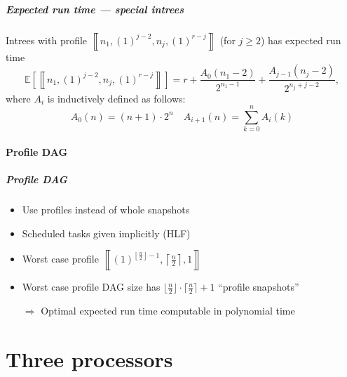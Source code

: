 \documentclass{beamer}
\newcommand{\profile}[1]{\left\llbracket #1 \right\rrbracket}
\newcommand{\profilerepeat}[2]{{(#1)}^{#2}}
\newcommand{\profileones}[1]{\profilerepeat{1}{#1}}
\newcommand{\E}[1]{\mathbb{E}\left[ #1 \right]}
\begin{document}
\begin{frame}
  \frametitle{Expected run time --- special intrees}
  \begin{theorem}
    Intrees with profile $\profile{n_1,\profileones{j-2},n_j,\profileones{r-j}}$ (for $j\geq 2$) has expected run time
    \begin{equation*}
      \E{\profile{n_1,\profileones{j-2},n_j,\profileones{r-j}}} = 
      r + \frac{A_0(n_1-2)}{2^{n_1-1}} + \frac{A_{j-1}(n_j-2)}{2^{n_j+j-2}},
    \end{equation*}
    where $A_i$ is inductively defined as follows:
    \begin{equation*}
      A_0(n) = (n+1) \cdot 2^n \quad 
      A_{i+1}(n) = \sum_{k=0}^n A_{i}(k)
    \end{equation*}
  \end{theorem}
\end{frame}

\subsection{Profile DAG}

\begin{frame}
  \frametitle{Profile DAG}
  \begin{itemize}
  \item Use profiles instead of whole snapshots
  \item Scheduled tasks given implicitly (HLF)
  \item Worst case profile $\profile{ \profileones{ \left\lfloor\frac{n}{2} \right\rfloor - 1}, \left\lceil \frac{n}{2} \right\rceil, 1 }$
  \item Worst case profile DAG size has $\lfloor \frac{n}{2} \rfloor \cdot \lceil \frac{n}{2} \rceil +1$ ``profile snapshots''

    $\Rightarrow$ Optimal expected run time computable in polynomial time 
    
    
  \end{itemize}
\end{frame}

\part{Three processors}
\end{document}

